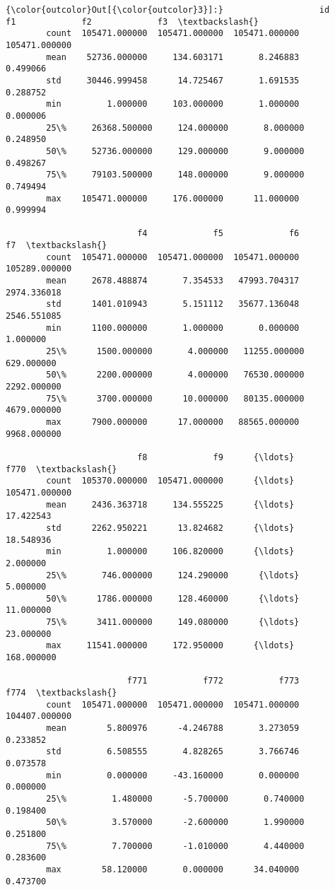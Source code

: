 \documentclass[11pt]{article}
\begin{document}
\begin{Verbatim}[commandchars=\\\{\}]
{\color{outcolor}Out[{\color{outcolor}3}]:}                   id             f1             f2             f3  \textbackslash{}
        count  105471.000000  105471.000000  105471.000000  105471.000000   
        mean    52736.000000     134.603171       8.246883       0.499066   
        std     30446.999458      14.725467       1.691535       0.288752   
        min         1.000000     103.000000       1.000000       0.000006   
        25\%     26368.500000     124.000000       8.000000       0.248950   
        50\%     52736.000000     129.000000       9.000000       0.498267   
        75\%     79103.500000     148.000000       9.000000       0.749494   
        max    105471.000000     176.000000      11.000000       0.999994   
        
                          f4             f5             f6             f7  \textbackslash{}
        count  105471.000000  105471.000000  105471.000000  105289.000000   
        mean     2678.488874       7.354533   47993.704317    2974.336018   
        std      1401.010943       5.151112   35677.136048    2546.551085   
        min      1100.000000       1.000000       0.000000       1.000000   
        25\%      1500.000000       4.000000   11255.000000     629.000000   
        50\%      2200.000000       4.000000   76530.000000    2292.000000   
        75\%      3700.000000      10.000000   80135.000000    4679.000000   
        max      7900.000000      17.000000   88565.000000    9968.000000   
        
                          f8             f9      {\ldots}                 f770  \textbackslash{}
        count  105370.000000  105471.000000      {\ldots}        105471.000000   
        mean     2436.363718     134.555225      {\ldots}            17.422543   
        std      2262.950221      13.824682      {\ldots}            18.548936   
        min         1.000000     106.820000      {\ldots}             2.000000   
        25\%       746.000000     124.290000      {\ldots}             5.000000   
        50\%      1786.000000     128.460000      {\ldots}            11.000000   
        75\%      3411.000000     149.080000      {\ldots}            23.000000   
        max     11541.000000     172.950000      {\ldots}           168.000000   
        
                        f771           f772           f773           f774  \textbackslash{}
        count  105471.000000  105471.000000  105471.000000  104407.000000   
        mean        5.800976      -4.246788       3.273059       0.233852   
        std         6.508555       4.828265       3.766746       0.073578   
        min         0.000000     -43.160000       0.000000       0.000000   
        25\%         1.480000      -5.700000       0.740000       0.198400   
        50\%         3.570000      -2.600000       1.990000       0.251800   
        75\%         7.700000      -1.010000       4.440000       0.283600   
        max        58.120000       0.000000      34.040000       0.473700   
        

\end{Verbatim}
\end{document}

